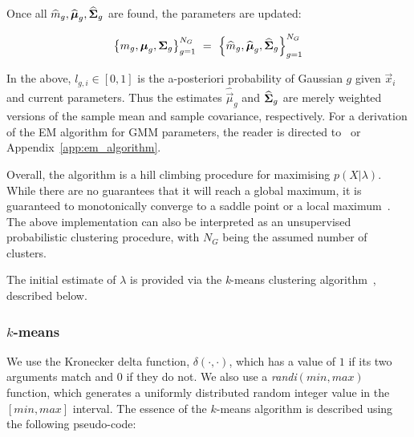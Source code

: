 \noindent
Once all $\widehat{m}_g, \widehat{{\boldsymbol{\mu}}}_g, \widehat{{\boldsymbol{\Sigma}}}_g$ are found, the parameters are updated:

\begin{equation}
\left\{ m_g, {\boldsymbol{\mu}}_g, {\boldsymbol{\Sigma}}_g \right\}_{g=1}^{N_G} ~ = ~ \left\{ \widehat{m}_g, \widehat{{\boldsymbol{\mu}}}_g, \widehat{{\boldsymbol{\Sigma}}}_g \right\}_{g=1}^{N_G} 
\end{equation}

\noindent In the above, $l_{g,i} \in [0,1]$ is the {a-posteriori} probability of Gaussian $g$ given $\Vec{x}_i$ and current parameters.
Thus the estimates $\widehat{\Vec{\mu}}_g$ and $\widehat{{\boldsymbol{\Sigma}}}_g$ are merely weighted versions of the
sample mean and sample covariance, respectively.
For a derivation of the EM algorithm for GMM parameters, the reader is directed to~\cite{Bilmes98, Redner84} or Appendix~\ref{app:em_algorithm}.

Overall, the algorithm is a hill climbing procedure for maximising $p(X | \lambda)$.
While there are no guarantees that it will reach a global maximum, it is guaranteed to monotonically converge to a saddle point or a local maximum~\cite{Dempster77,Duda01,Mitchell97}.
The above implementation can also be interpreted as an unsupervised probabilistic clustering procedure,
with $N_G$ being the assumed number of clusters.

The initial estimate of $\lambda$ is provided via the {\it k}-means clustering algorithm~\cite{Duda01},
described below.

%
%

\subsubsection{$k$-means}
\label{sec:ch_gmm_kmeans}

We use the Kronecker delta function, $\delta(\cdot,\cdot)$,
which has a value of $1$ if its two arguments match and $0$ if they do not.
We also use a {\it randi}$(min,max)$ function, 
which generates a uniformly distributed random integer value in the $[min,max]$ interval.
The essence of the $k$-means  algorithm is described using the following pseudo-code:

